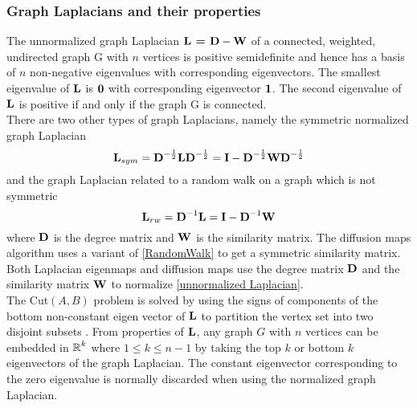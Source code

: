 \subsubsection{Graph Laplacians and their properties}
The unnormalized graph Laplacian $\textbf{L = D} - \textbf{W}$  of a connected, weighted,
undirected graph G with $n$ vertices is positive semidefinite and hence 
has a basis of $n$ non-negative eigenvalues with corresponding  eigenvectors.
The smallest eigenvalue of $\textbf{L}$ is $\boldsymbol{0}$ with corresponding eigenvector $\boldsymbol{1}$. 
The second eigenvalue of $\textbf{L}$ is positive if and only if the graph G is connected.\\
There are two other types of graph Laplacians, namely the symmetric normalized
graph Laplacian 
\begin{equation}\label{normalizedLaplacian}
\textbf{L}_{sym} = \textbf{D}^{-\frac{1}{2}} \textbf{L} \textbf{D}^{-\frac{1}{2}} =
\textbf{I} - \textbf{D}^{-\frac{1}{2}} \textbf{W} \textbf{D}^{-\frac{1}{2}}
\end{equation}
and 
the graph Laplacian related to a random walk on a graph which is not symmetric
\begin{equation}\label{RandomWalk}
\textbf{L}_{rw} = \textbf{D}^{-1}\textbf{L} = \textbf{I} - \textbf{D}^{-1}\textbf{W}
\end{equation}
where $\textbf{D}$ is the degree matrix and $\textbf{W}$ is the similarity matrix.
The diffusion maps algorithm uses a variant of \eqref{RandomWalk} to get a symmetric similarity
matrix. 
Both Laplacian eigenmaps and diffusion maps use the degree matrix $\textbf{D}$
and the similarity matrix $\textbf{W}$ to normalize \eqref{unnormalized Laplacian}.\\

The Cut$(A,B)$ problem is solved by using the signs of components of the bottom non-constant eigen vector of $\textbf{L}$ to partition the vertex set into two disjoint subsets \cite{Luxburg2007}.
From properties of $\textbf{L}$, any graph $G$ with $n$ vertices can be embedded in $\operatorname{\mathbb{R}}^{k}$ where $1 \leq k \leq n-1$ by taking the top $k$ or bottom $k$ eigenvectors of the graph Laplacian.
The constant eigenvector corresponding to the zero eigenvalue is normally
discarded when using the normalized graph Laplacian.



